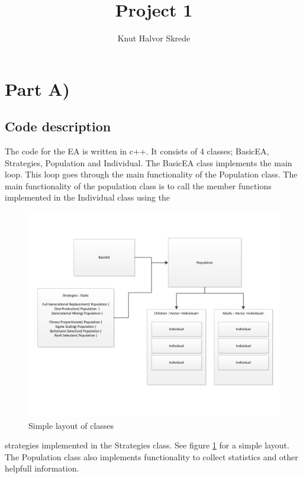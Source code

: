 \documentclass[11pt]{article}
\title{Project 1}
\author{Knut Halvor Skrede}
\begin{document}
\maketitle
\clearpage

\section*{Part A)}

\subsection*{Code description} %

The code for the EA is written in c++. It consists of 4 classes; 
BasicEA, Strategies, Population and Individual.
The BasicEA class implements the main loop. This loop goes through
the main functionality of the Population class.
The main functionality of the population class is to call the
member functions implemented in the Individual class using the
\begin{figure}[ht]
\begin{center}
\includegraphics[width=\textwidth]{images/classes.png}
\end{center}
\caption{Simple layout of classes}
\label{fig:classes}
\end{figure}
strategies implemented in the Strategies class. See figure \ref{fig:classes}
for a simple layout. The Population class also implements functionality
to collect statistics and other helpfull information.
\end{document}
